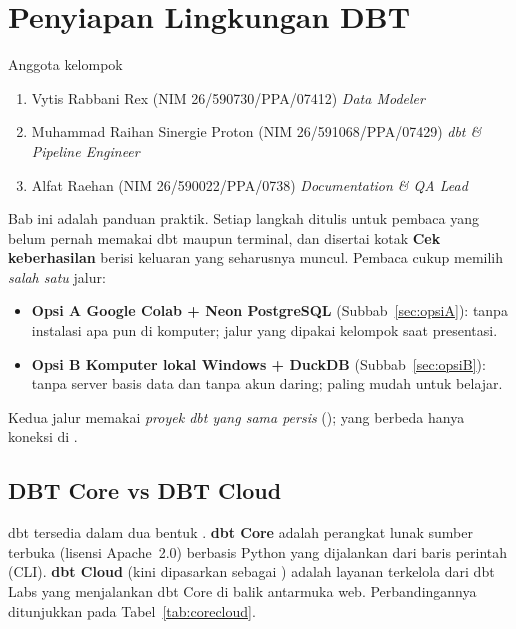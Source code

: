 \chapter{Penyiapan Lingkungan DBT}
\begin{mybox}{Anggota kelompok}
\begin{enumerate}
    \itemsep0em
    \item Vytis Rabbani Rex (NIM 26/590730/PPA/07412) \textendash{} \textit{Data Modeler}
    \item Muhammad Raihan Sinergie Proton (NIM 26/591068/PPA/07429) \textendash{} \textit{dbt \& Pipeline Engineer}
    \item Alfat Raehan (NIM 26/590022/PPA/0738) \textendash{} \textit{Documentation \& QA Lead}
\end{enumerate}
\end{mybox}

Bab ini adalah panduan praktik. Setiap langkah ditulis untuk pembaca yang belum pernah memakai dbt maupun terminal, dan disertai kotak \textbf{Cek keberhasilan} berisi keluaran yang seharusnya muncul. Pembaca cukup memilih \emph{salah satu} jalur:

\begin{itemize}[nosep]
    \item \textbf{Opsi A \textendash{} Google Colab + Neon PostgreSQL} (Subbab~\ref{sec:opsiA}): tanpa instalasi apa pun di komputer; jalur yang dipakai kelompok saat presentasi.
    \item \textbf{Opsi B \textendash{} Komputer lokal Windows + DuckDB} (Subbab~\ref{sec:opsiB}): tanpa server basis data dan tanpa akun daring; paling mudah untuk belajar.
\end{itemize}

Kedua jalur memakai \emph{proyek dbt yang sama persis} (); yang berbeda hanya  koneksi di .

\section{DBT Core vs DBT Cloud}\label{sec:corecloud}
dbt tersedia dalam dua bentuk \citep{dbtdocs}. \textbf{dbt Core} adalah perangkat lunak sumber terbuka (lisensi Apache~2.0) berbasis Python yang dijalankan dari baris perintah (CLI). \textbf{dbt Cloud} (kini dipasarkan sebagai ) adalah layanan terkelola dari dbt Labs yang menjalankan dbt Core di balik antarmuka web. Perbandingannya ditunjukkan pada Tabel~\ref{tab:corecloud}.

